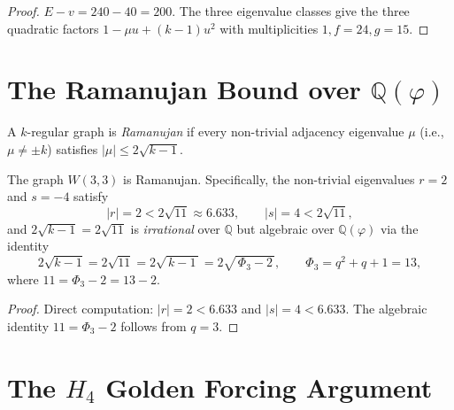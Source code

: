 \begin{proof}
$E - v = 240 - 40 = 200$.  The three eigenvalue classes give the
three quadratic factors $1-\mu u+(k-1)u^2$ with multiplicities
$1, f=24, g=15$.
\end{proof}

\section{\texorpdfstring{The Ramanujan Bound over $\mathbb{Q}(\varphi)$}{The Ramanujan Bound over Q(phi)}}
\label{sec:ramanujan}

\begin{definition}
A $k$-regular graph is \emph{Ramanujan} if every non-trivial
adjacency eigenvalue $\mu$ (i.e., $\mu\ne\pm k$) satisfies
$|\mu|\le 2\sqrt{k-1}$.
\end{definition}

\begin{theorem}
\label{thm:ramanujan}
The graph $W(3,3)$ is Ramanujan.  Specifically, the non-trivial
eigenvalues $r=2$ and $s=-4$ satisfy
\begin{equation}
  |r| = 2 < 2\sqrt{11} \approx 6.633,
  \qquad
  |s| = 4 < 2\sqrt{11},
  \label{eq:ram_bound}
\end{equation}
and $2\sqrt{k-1}=2\sqrt{11}$ is \emph{irrational} over $\mathbb{Q}$
but algebraic over $\mathbb{Q}(\varphi)$ via the identity
\begin{equation}
  2\sqrt{k-1} = 2\sqrt{11}
  = 2\sqrt{\,k - 1\,}
  = 2\sqrt{\,\Phi_3 - 2\,},
  \qquad
  \Phi_3 = q^2+q+1 = 13,
  \label{eq:sqrt11}
\end{equation}
where $11 = \Phi_3 - 2 = 13-2$.
\end{theorem}

\begin{proof}
Direct computation: $|r|=2<6.633$ and $|s|=4<6.633$.
The algebraic identity $11=\Phi_3-2$ follows from $q=3$.
\end{proof}

\section{\texorpdfstring{The $H_4$ Golden Forcing Argument}{The H4 Golden Forcing Argument}}
\label{sec:golden_forcing}

